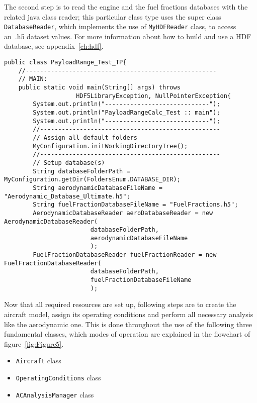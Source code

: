 The second step is to read the engine and the fuel fractions databases with the related java class reader; this particular class type uses the super class \lstinline[language=Java]!DatabaseReader!, which implements the use of \lstinline[language=Java]!MyHDFReader! class, to access an~.h5 dataset values. For more information about how to build and use a \gls{HDF} database, see appendix~\ref{ch:hdf}.

\bigskip
\begin{lstlisting}[caption={Excerpt of the ATR-72 Payload-Range test - preliminary steps}, captionpos=b, tabsize=2]
public class PayloadRange_Test_TP{
	//-----------------------------------------------------
	// MAIN:
	public static void main(String[] args) throws
					HDF5LibraryException, NullPointerException{
		System.out.println("-----------------------------");
		System.out.println("PayloadRangeCalc_Test :: main");
		System.out.println("-----------------------------");
		//--------------------------------------------------
		// Assign all default folders
		MyConfiguration.initWorkingDirectoryTree();
		//--------------------------------------------------
		// Setup database(s)	
		String databaseFolderPath = MyConfiguration.getDir(FoldersEnum.DATABASE_DIR);
		String aerodynamicDatabaseFileName = "Aerodynamic_Database_Ultimate.h5";
		String fuelFractionDatabaseFileName = "FuelFractions.h5";
		AerodynamicDatabaseReader aeroDatabaseReader = new AerodynamicDatabaseReader(
						databaseFolderPath,
						aerodynamicDatabaseFileName
						);
		FuelFractionDatabaseReader fuelFractionReader = new FuelFractionDatabaseReader(
						databaseFolderPath,
						fuelFractionDatabaseFileName
						);
\end{lstlisting}

\noindent
Now that all required resources are set up, following steps are to create the aircraft model, assign its operating conditions and perform all necessary analysis like the aerodynamic one. This is done throughout the use of the following three fundamental classes, which modes of operation are explained in the flowchart of figure~\ref{fig:Figure5}.

\begin{itemize}
\item\lstinline[language=Java]!Aircraft! class
\item\lstinline[language=Java]!OperatingConditions! class
\item\lstinline[language=Java]!ACAnalysisManager! class
\end{itemize}

